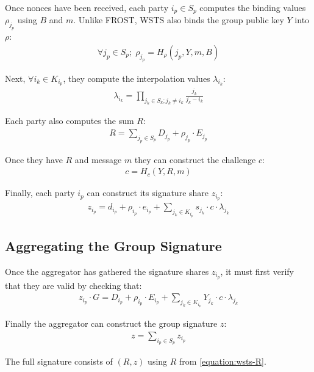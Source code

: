 \documentclass{article}
\theoremstyle{plain}
\theoremstyle{definition}
\theoremstyle{remark}
\begin{document}
Once nonces have been received, each party $i_p \in S_p$ computes the binding values $\rho_{j_p}$ using $B$ and $m$.  Unlike FROST, WSTS also binds the group public key $Y$ into $\rho$:
\begin{align}\label{equation:wsts-rho}
  \forall j_p \in S_p;\;\rho_{j_p} = H_\rho(j_p, Y, m, B)
\end{align}

Next, $\forall i_k \in K_{i_p}$,  they compute the interpolation values $\lambda_{i_k}$:
\begin{align}\label{equation:wsts-lambda}
  \lambda_{i_k} = \prod_{j_k \in S_k; j_k \neq i_k}^{} \frac{j_k}{j_k - i_k}
\end{align}

Each party also computes the sum $R$:
\begin{align}\label{equation:wsts-R}
  R = \sum_{j_p \in S_p}^{} D_{j_p} + \rho_{j_p} \cdot E_{j_p}
\end{align}

Once they have $R$ and message $m$ they can construct the challenge $c$:
\begin{align}\label{equation:wsts-c}
  c = H_c(Y, R, m)
\end{align}

Finally, each party $i_p$ can construct its signature share $z_{i_p}$:
\begin{align}\label{equation:wsts-z}
  z_{i_p} = d_{i_p} + \rho_{i_p} \cdot e_{i_p} + \sum_{j_k \in K_{i_p}}^{} s_{j_k} \cdot c \cdot \lambda_{j_k}
\end{align}


\subsection{
  Aggregating the Group Signature
}

Once the aggregator has gathered the signature shares $z_{i_p}$, it must first verify that they are valid by checking that:
\begin{align}\label{equation:wsts-share-check}
  z_{i_p} \cdot G = D_{i_p} + \rho_{i_p} \cdot E_{i_p} + \sum_{j_k \in K_{i_p}}^{} Y_{j_k} \cdot c \cdot \lambda_{j_k}
\end{align}

Finally the aggregator can construct the group signature $z$:
\begin{align}\label{equation:wsts-z-sum}
  z = \sum_{i_p \in S_p}^{} z_{i_p}
\end{align}

The full signature consists of $(R, z)$ using $R$ from \eqref{equation:wsts-R}.
\end{document}
